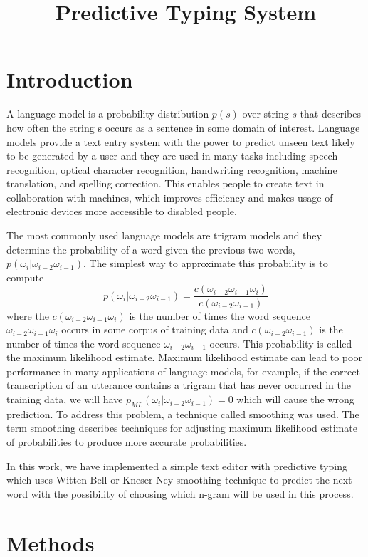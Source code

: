 \documentclass[10pt, a4paper]{article}
\title{Predictive Typing System}
\begin{document}
\maketitleabstract

\section{Introduction}
A language model is a probability distribution $p(s)$ over string $s$ that describes how often the string s occurs as a sentence in some domain of interest. 
Language models provide a text entry system with the power to predict unseen text likely to be generated by a user and they are used in many tasks including speech recognition, optical character recognition, handwriting recognition, machine translation, and spelling correction. This enables people to create text in collaboration with machines, which improves efficiency and makes usage of electronic devices more accessible to disabled people. 

The most commonly used language models are trigram models and they determine the probability of a word given the previous two words, $ p(\omega_i|\omega_{i-2}\omega_{i-1}) $. The simplest way to approximate this probability is to compute 
\begin{equation}
p(\omega_i|\omega_{i-2}\omega_{i-1}) = \frac{c(\omega_{i-2}\omega_{i-1}\omega_i)}{c(\omega_{i-2}\omega_{i-1})}
\end{equation}
where the $ c(\omega_{i-2}\omega_{i-1}\omega_i) $ is the number of times the word sequence $ \omega_{i-2}\omega_{i-1}\omega_i $ occurs in some corpus of training data and $ c(\omega_{i-2}\omega_{i-1}) $ is the number of times the word sequence $ \omega_{i-2}\omega_{i-1} $ occurs. This probability is called the maximum likelihood estimate. Maximum likelihood estimate can lead to poor performance in many applications of language models, for example, if the correct transcription of an utterance contains a trigram that has never occurred in the training data, we will have $ p_{ML}(\omega_i|\omega_{i-2}\omega_{i-1})=0 $ which will cause the wrong prediction. To address this problem, a technique called smoothing was used. The term smoothing describes techniques for adjusting maximum likelihood estimate of probabilities to produce more accurate probabilities. 

In this work, we have implemented a simple text editor with predictive typing which uses Witten-Bell or Kneser-Ney smoothing technique to predict the next word with the possibility of choosing which n-gram will be used in this process.  


\section{Methods}
\end{document}
